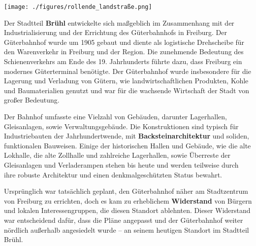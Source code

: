 \documentclass[landscape, a4paper]{article}
\newcommand\alert[1]{\textcolor{PrimaryColor}{\textbf{#1}}}
\begin{document}
\hfill%
\vrule width 0.01cm
\hfill%
\begin{minipage}[t]{0.31\textwidth}
	\vspace{0cm}
	\setlength{\parskip}{0.25cm}

	\texttt{[image: ./figures/rollende\_landstraße.png]}
	\setlength{\parskip}{0.25cm}

	Der Stadtteil \alert{Brühl} entwickelte sich maßgeblich im Zusammenhang mit der Industrialisierung und der Errichtung des Güterbahnhofs in Freiburg. Der Güterbahnhof wurde um 1905 gebaut und diente als logistische Drehscheibe für den Warenverkehr in Freiburg und der Region. Die zunehmende Bedeutung des Schienenverkehrs am Ende des 19. Jahrhunderts führte dazu, dass Freiburg ein modernes Güterterminal benötigte.
	Der Güterbahnhof wurde insbesondere für die Lagerung und Verladung von Gütern, wie landwirtschaftlichen Produkten, Kohle und Baumaterialien genutzt und war für die wachsende Wirtschaft der Stadt von großer Bedeutung.

	Der Bahnhof umfasste eine Vielzahl von Gebäuden, darunter Lagerhallen, Gleisanlagen, sowie Verwaltungsgebäude. Die Konstruktionen sind typisch für Industriebauten der Jahrhundertwende, mit \alert{Backsteinarchitektur} und soliden, funktionalen Bauweisen. Einige der historischen Hallen und Gebäude, wie die alte Lokhalle, die alte Zollhalle und zahlreiche Lagerhallen, sowie Überreste der Gleisanlagen und Verladerampen stehen bis heute und werden teilweise durch ihre robuste Architektur und einen denkmalgeschützten Status bewahrt.

	Ursprünglich war tatsächlich geplant, den Güterbahnhof näher am Stadtzentrum von Freiburg zu errichten, doch es kam zu erheblichem \alert{Widerstand} von Bürgern und lokalen Interessengruppen, die diesen Standort ablehnten. Dieser Widerstand war entscheidend dafür, dass die Pläne angepasst und der Güterbahnhof weiter nördlich außerhalb angesiedelt wurde – an seinem heutigen Standort im Stadtteil Brühl.


\end{minipage}
\end{document}
